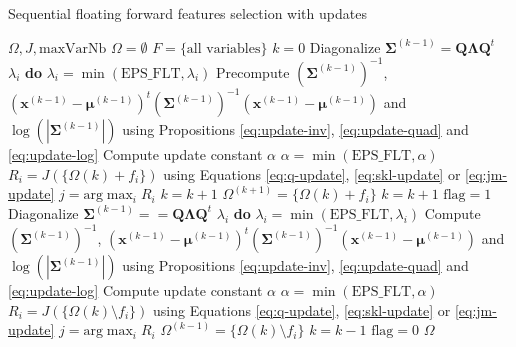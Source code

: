 \documentclass[journal,peerreview,onecolumn]{IEEEtran}
\begin{document}
    \begin{algorithm}
    \caption{Sequential floating forward features selection with updates\label{alg:sffs-update}}
    {\footnotesize
    \begin{algorithmic}[1]
    \REQUIRE $\Omega,J,\text{maxVarNb}$
    \STATE $\Omega=\emptyset$
    \STATE $F=\text{\{all variables\}}$
    \STATE $k=0$
    \STATE Diagonalize $\boldsymbol{\Sigma}^{(k-1)} = \mathbf{Q} \boldsymbol{\Lambda} \mathbf{Q}^t$
     $\lambda_i$ {\bfseries do} $\lambda_i = \min (\text{EPS\_FLT},\lambda_i)$
    \STATE Precompute {\scriptsize $(\boldsymbol{\Sigma}^{(k-1)})^{-1}$, $(\mathbf{x}^{(k-1)} - \boldsymbol{\mu}^{(k-1)})^t (\boldsymbol{\Sigma}^{(k-1)})^{-1} (\mathbf{x}^{(k-1)}- \boldsymbol{\mu}^{(k-1)})$ and $\log \left(|\boldsymbol{\Sigma}^{(k-1)}|\right)$} using Propositions \ref{eq:update-inv}, \ref{eq:update-quad} and \ref{eq:update-log}
    \STATE Compute update constant $\alpha$
    \STATE $\alpha = \min (\text{EPS\_FLT},\alpha)$
    \STATE $R_i = J(\{\Omega{(k)} + f_i\})$ using Equations \ref{eq:q-update}, \ref{eq:skl-update} or \ref{eq:jm-update}
    \ENDFOR
    \STATE $j=\text{arg} \max_{i} R_i$
    \STATE $k=k+1$
    \ELSE
    \STATE $\Omega^{(k+1)} = \{\Omega{(k)} + f_i\}$
    \STATE $k=k+1$
    \STATE $\text{flag}=1$
    \STATE Diagonalize $\boldsymbol{\Sigma}^{(k-1)} = = \mathbf{Q} \boldsymbol{\Lambda} \mathbf{Q}^t$
     $\lambda_i$ {\bfseries do} $\lambda_i = \min (\text{EPS\_FLT},\lambda_i)$
    \STATE Compute {\scriptsize $(\boldsymbol{\Sigma}^{(k-1)})^{-1}$, $(\mathbf{x}^{(k-1)} - \boldsymbol{\mu}^{(k-1)})^t (\boldsymbol{\Sigma}^{(k-1)})^{-1} (\mathbf{x}^{(k-1)}- \boldsymbol{\mu}^{(k-1)})$ and $\log \left(|\boldsymbol{\Sigma}^{(k-1)}|\right)$} using Propositions \ref{eq:update-inv}, \ref{eq:update-quad} and \ref{eq:update-log}
    \STATE Compute update constant $\alpha$
    \STATE $\alpha = \min (\text{EPS\_FLT},\alpha)$
    \STATE $R_i = J(\{\Omega{(k)}\setminus f_i\})$ using Equations \ref{eq:q-update}, \ref{eq:skl-update} or \ref{eq:jm-update}
    \ENDFOR
    \STATE $j=\text{arg} \max_{i} R_i$
    \STATE $\Omega^{(k-1)} = \{\Omega{(k)} \setminus f_i\}$
    \STATE $k=k-1$
    \ELSE
    \STATE $\text{flag}=0$
    \ENDIF
    \ENDWHILE
    \ENDIF
    \ENDWHILE
    \RETURN $\Omega$
    \end{algorithmic}
    }
    \end{algorithm}
\end{document}
